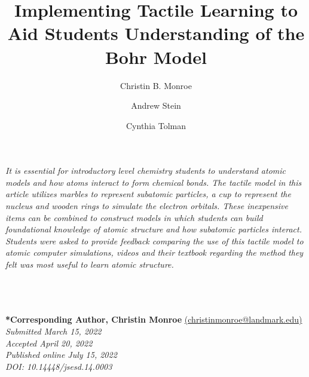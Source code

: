 \documentclass[11pt]{sig-alternate}
\makeatletter
\let\oldabstract\abstract
\let\oldendabstract\endabstract
\renewenvironment{abstract}
{\renewenvironment{quotation}%
               {\list{}{\addtolength{\leftmargin}{1em} %
                        \listparindent 1.5em%
                        \itemindent    \listparindent%
                        \rightmargin   \leftmargin%
                        \parsep        \z@ \@plus\p@}%
                \item\relax}%
               {\endlist}%
\oldabstract}
{\oldendabstract}
\makeatother
\begin{document}
\title{Implementing Tactile Learning to Aid Students Understanding of the Bohr Model}
\begin{large}
\author[1]{\large \color{blue} Christin B. Monroe}
\author[1]{\large \color{blue} Andrew Stein}
\author[1]{\large \color{blue}  Cynthia Tolman}

\end{large}
\toappear{}

\maketitle
\begin{@twocolumnfalse} 

\begin{abstract}
     \textit{It is essential for introductory level chemistry students to understand atomic models and how atoms interact to form chemical bonds.  The tactile model in this article utilizes marbles to represent subatomic particles, a cup to represent the nucleus and wooden rings to simulate the electron orbitals.  These inexpensive items can be combined to construct models in which students can build foundational knowledge of atomic structure and how subatomic particles interact.  Students were asked to provide feedback comparing the use of this tactile model to atomic computer simulations, videos and their textbook regarding the method they felt was most useful to learn atomic structure.}
\end{abstract}
\end{@twocolumnfalse}



\\ \\ \\
\textbf{*Corresponding Author, Christin Monroe} \href{mailto:christinmonroe@landmark.edu}{(christinmonroe@landmark.edu)} \\
\textit{Submitted March 15, 2022 }\\
\textit{Accepted April 20, 2022} \\
\textit{Published online July 15, 2022} \\
\textit{DOI: 10.14448/jsesd.14.0003} \\


\pagebreak
\pagebreak

\vspace{5mm}
\section*{\vspace{140mm}}
\end{document}

